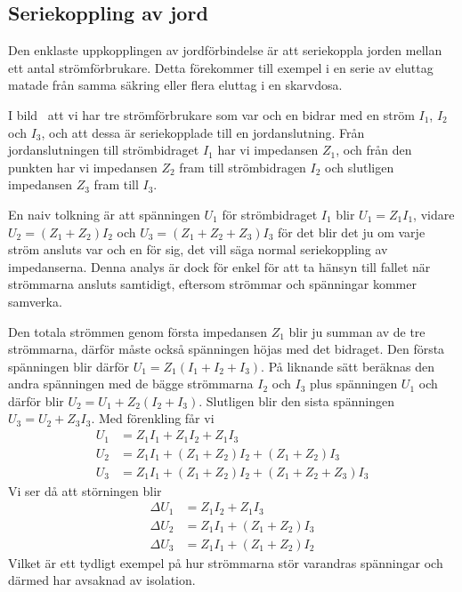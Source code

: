 \subsection{Seriekoppling av jord}

Den enklaste uppkopplingen av jordförbindelse är att seriekoppla jorden
\cite[kap 3]{ott1988} mellan ett antal strömförbrukare.
Detta förekommer till exempel i en serie av eluttag matade från samma säkring
eller flera eluttag i en skarvdosa.

I bild~ att vi har tre strömförbrukare som var och en
bidrar med en ström \(I_1\), \(I_2\) och \(I_3\), och att dessa är
seriekopplade till en jordanslutning.
Från jordanslutningen till strömbidraget \(I_1\) har vi impedansen \(Z_1\),
och från den punkten har vi impedansen \(Z_2\) fram till strömbidragen \(I_2\)
och slutligen impedansen \(Z_3\) fram till \(I_3\).

En naiv tolkning är att spänningen \(U_1\) för strömbidraget \(I_1\) blir
\(U_1 = Z_1 I_1\), vidare \(U_2 = (Z_1 + Z_2) I_2\) och
\(U_3 = (Z_1 + Z_2 + Z_3) I_3\) för det blir det ju om varje ström ansluts var
och en för sig, det vill säga normal seriekoppling av impedanserna.
Denna analys är dock för enkel för att ta hänsyn till fallet när strömmarna
ansluts samtidigt, eftersom strömmar och spänningar kommer samverka.

Den totala strömmen genom första impedansen \(Z_1\) blir ju summan av de tre
strömmarna, därför måste också spänningen höjas med det bidraget.
Den första spänningen blir därför \(U_1=Z_1 (I_1 + I_2 + I_3)\).
På liknande sätt beräknas den andra spänningen med de bägge strömmarna \(I_2\)
och \(I_3\) plus spänningen \(U_1\) och därför blir
\(U_2 = U_1 + Z_2 (I_2 + I_3)\).
Slutligen blir den sista spänningen \(U_3 = U_2 + Z_3 I_3\).
Med förenkling får vi
\[
\begin{array}{ll}
U_1 & = Z_1 I_1 + Z_1 I_2 + Z_1 I_3 \\
U_2 & = Z_1 I_1 + (Z_1 + Z_2) I_2 + (Z_1 + Z_2) I_3 \\
U_3 & = Z_1 I_1 + (Z_1 + Z_2) I_2 + (Z_1 + Z_2 + Z_3) I_3
\end{array}
\]
Vi ser då att störningen blir
\[
\begin{array}{ll}
\Delta U_1 & =  Z_1 I_2 + Z_1 I_3 \\
\Delta U_2 & = Z_1 I_1 + (Z_1 + Z_2) I_3 \\
\Delta U_3 & = Z_1 I_1 + (Z_1 + Z_2) I_2
\end{array}
\]
Vilket är ett tydligt exempel på hur strömmarna stör varandras spänningar och
därmed har avsaknad av isolation.

